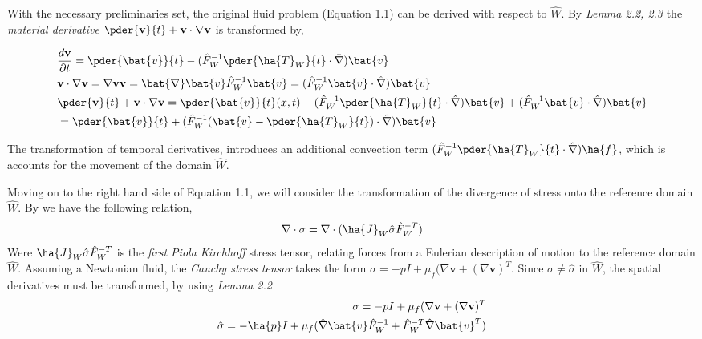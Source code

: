 With the necessary preliminaries set, the original fluid problem (Equation 1.1) can be derived with respect to $\hat{W}$. By \textit{Lemma 2.2, 2.3}  the \textit{material derivative} $\pder{\mathbf{v}}{t} + \mathbf{v} \cdot \nabla \mathbf{v}$ is transformed by, 

\begin{align}
&\frac{d \mathbf{v}}{\partial t} = 
\pder{\bat{v}}{t} - (\hat{F}_W^{-1}\pder{\ha{T}_W}{t} \cdot \hat{\nabla})\bat{v} \\
&\mathbf{v} \cdot \nabla \mathbf{v} = \nabla \mathbf{v} \mathbf{v} = 
\bat{\nabla}\bat{v}\hat{F}_W^{-1}\bat{v} = (\hat{F}_W^{-1}\bat{v} \cdot \hat{\nabla})\bat{v} \\
&\pder{\mathbf{v}}{t} + \mathbf{v} \cdot \nabla \mathbf{v} = 
\pder{\bat{v}}{t}(x,t) - (\hat{F}_W^{-1}\pder{\ha{T}_W}{t} \cdot \hat{\nabla})\bat{v}
+ (\hat{F}_W^{-1}\bat{v} \cdot \hat{\nabla})\bat{v}  \\
&= \pder{\bat{v}}{t} + (\hat{F}_W^{-1}(\bat{v} - \pder{\ha{T}_W}{t}) \cdot \hat{\nabla}) \bat{v}
\end{align}

The transformation of temporal derivatives, introduces an additional convection term 
$ (\hat{F}_W^{-1} \pder{\ha{T}_W}{t} \cdot \hat{\nabla}) \ha{f}$, which is accounts for the movement of the domain $\hat{W}$. 

Moving on to the right hand side of Equation 1.1, we will consider the transformation of the divergence of stress onto the reference domain $\hat{W}$. By \cite{Richter2016} we have the following relation,
\begin{align}
\nabla \cdot \sigma = \nabla \cdot (\ha{J}_W \hat{\sigma}\hat{F}_W^{-T})
\end{align}
Were $\ha{J}_W \hat{\sigma}\hat{F}_W^{-T}$ is the \textit{first Piola Kirchhoff} stress tensor, relating forces from a Eulerian description of motion to the reference domain $\hat{W}$.
Assuming a Newtonian fluid, the \textit{Cauchy stress tensor} takes the form $\sigma = -p I + \mu_f(\nabla \mathbf{v} + (\nabla \mathbf{v})^T$. Since $\sigma \neq \hat{\sigma}$ in $\hat{W}$, the spatial derivatives must be transformed, by using \textit{Lemma 2.2}
\begin{align*}
\sigma = -p I + \mu_f(\nabla \mathbf{v} + (\nabla \mathbf{v})^T \\
\hat{\sigma} = -\ha{p} I + \mu_f(\hat{\nabla}\bat{v}\hat{F}_W^{-1} +\hat{F}_W^{-T}\hat{\nabla}\bat{v}^T )
\end{align*} 

